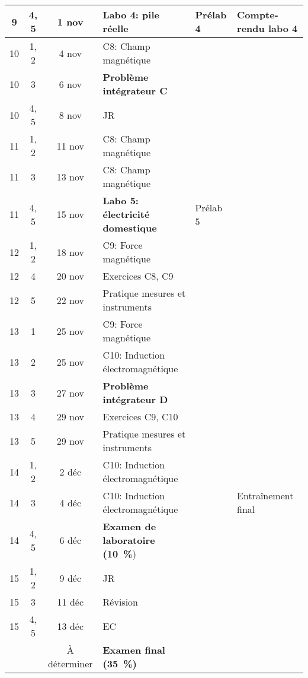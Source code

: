 \documentclass[10pt]{article}
\begin{document}
\begin{longtable}{cccp{6cm}lp{9cm}}
  9     &  4, 5  &  1 nov    &  \textbf{Labo 4: pile réelle}
    &  Prélab 4  &  Compte-rendu labo 4 \\
  \midrule
  10    &  1, 2  &  4 nov    &  C8: Champ magnétique  \\*
  10    &  3     &  6 nov    &  \textbf{Problème intégrateur C} &   &    \\*
  10    &  4, 5  &  8 nov    &  JR
    &    &   \\
  \midrule
  11    &  1, 2  &  11 nov   &  C8: Champ magnétique  \\
  11    &  3     &  13 nov   &  C8: Champ magnétique  \\
  11    &  4, 5  &  15 nov   &  \textbf{Labo 5: électricité domestique}
    &  Prélab 5  &    \\
  \midrule
  12    &  1, 2  &  18 nov   &  C9: Force magnétique  \\
  12    &  4     &  20 nov   &  Exercices C8, C9  &  &  \\
  12    &  5     &  22 nov   &  Pratique mesures et instruments  &  &  \\
  \midrule
  13    &  1     &  25 nov   &  C9: Force magnétique  \\
  13    &  2     &  25 nov   &  C10: Induction électromagnétique  \\
  13    &  3     &  27 nov   &  \textbf{Problème intégrateur D}  \\
  13    &  4     &  29 nov   &  Exercices C9, C10  \\
  13    &  5     &  29 nov   &  Pratique mesures et instruments  &  &  \\
  \midrule
  14    &  1, 2  &  2 déc    &  C10: Induction électromagnétique  \\
  14    &  3     &  4 déc    &  C10: Induction électromagnétique &  &  Entraînement final  \\
  14    &  4, 5  &  6 déc    &  \textbf{Examen de laboratoire (\qty{10}{\percent}})
    &    &   \\
  \midrule
  15    &  1, 2  &  9 déc    &  JR \\
  15    &  3     &  11 déc   &  Révision   \\
  15    &  4, 5  &  13 déc   &  EC
    &    &   \\
        &        & À déterminer  &  \textbf{Examen final (\qty{35}{\percent})}  \\
  \bottomrule
\end{longtable}
\end{document}
